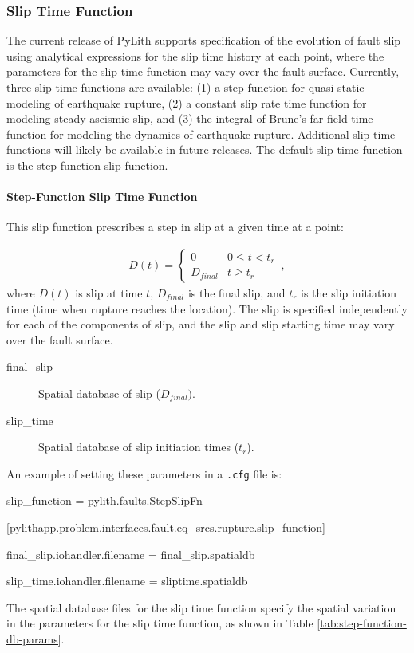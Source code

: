 \subsubsection{Slip Time Function}

The current release of PyLith supports specification of the evolution
of fault slip using analytical expressions for the slip time history
at each point, where the parameters for the slip time function may
vary over the fault surface. Currently, three slip time functions
are available: (1) a step-function for quasi-static modeling of earthquake
rupture, (2) a constant slip rate time function for modeling steady
aseismic slip, and (3) the integral of Brune's far-field time function
\cite{Brune:1970} for modeling the dynamics of earthquake rupture.
Additional slip time functions will likely be available in future
releases. The default slip time function is the step-function slip
function.


\paragraph{Step-Function Slip Time Function}

This slip function prescribes a step in slip at a given time at a
point: 

\begin{gather}
D(t)=\left\{ \begin{array}{cc}
0 & 0\leq t<t_{r}\\
D_{final} & t\ge t_{r}
\end{array}\right.\,,
\end{gather}
where $D(t)$ is slip at time $t$, $D_{final}$ is the final slip,
and $t_{r}$ is the slip initiation time (time when rupture reaches
the location). The slip is specified independently for each of the
components of slip, and the slip and slip starting time may vary over
the fault surface.
\begin{description}
\item [{final\_slip}] Spatial database of slip ($D_{final})$.
\item [{slip\_time}] Spatial database of slip initiation times ($t_{r}$).
\end{description}
An example of setting these parameters in a \texttt{.cfg} file is:
\begin{lyxcode}

slip\_function = pylith.faults.StepSlipFn 

[pylithapp.problem.interfaces.fault.eq\_srcs.rupture.slip\_function]

final\_slip.iohandler.filename = final\_slip.spatialdb

slip\_time.iohandler.filename = sliptime.spatialdb
\end{lyxcode}
The spatial database files for the slip time function specify the
spatial variation in the parameters for the slip time function, as
shown in Table \vref{tab:step-function-db-params}.

